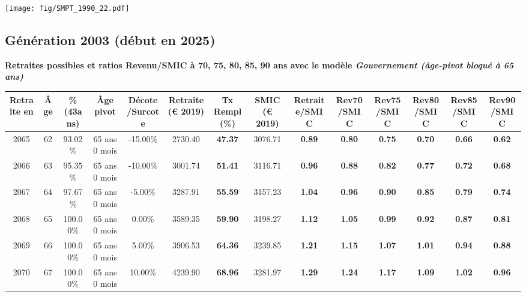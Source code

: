  \vspace{0.1cm} 

 \begin{center}\texttt{[image: fig/SMPT\_1990\_22.pdf]}\end{center} \label{fig/SMPT_1990_22.pdf} 

\newpage 
 
\subsection{Génération 2003 (début en 2025)} 

{\bf \noindent Retraites possibles et ratios Revenu/SMIC à 70, 75, 80, 85, 90 ans avec le modèle \emph{Gouvernement (âge-pivot bloqué à 65 ans)}}  
 
\begin{adjustbox}{max width=\textwidth} 
\begin{tabular}[htb]{|c|c||c|c|c||c|c||c||c|c|c|c|c|c|} 
\hline 
 Retraite en &  Âge &  \%(43ans) &  Âge pivot &  Décote/Surcote &  Retraite (\euro{} 2019) &  Tx Rempl(\%) &  SMIC (\euro{} 2019) &  Retraite/SMIC &  Rev70/SMIC &  Rev75/SMIC &  Rev80/SMIC &  Rev85/SMIC &  Rev90/SMIC \\ 
\hline \hline 
 2065 &  62 &  93.02\% &  65 ans 0 mois &  -15.00\% &  2730.40 &  {\bf 47.37} &  3076.71 &  {\bf {\color{red} 0.89}} &  {\bf {\color{red} 0.80}} &  {\bf {\color{red} 0.75}} &  {\bf {\color{red} 0.70}} &  {\bf {\color{red} 0.66}} &  {\bf {\color{red} 0.62}} \\ 
\hline 
 2066 &  63 &  95.35\% &  65 ans 0 mois &  -10.00\% &  3001.74 &  {\bf 51.41} &  3116.71 &  {\bf {\color{red} 0.96}} &  {\bf {\color{red} 0.88}} &  {\bf {\color{red} 0.82}} &  {\bf {\color{red} 0.77}} &  {\bf {\color{red} 0.72}} &  {\bf {\color{red} 0.68}} \\ 
\hline 
 2067 &  64 &  97.67\% &  65 ans 0 mois &  -5.00\% &  3287.91 &  {\bf 55.59} &  3157.23 &  {\bf 1.04} &  {\bf {\color{red} 0.96}} &  {\bf {\color{red} 0.90}} &  {\bf {\color{red} 0.85}} &  {\bf {\color{red} 0.79}} &  {\bf {\color{red} 0.74}} \\ 
\hline 
 2068 &  65 &  100.00\% &  65 ans 0 mois &  0.00\% &  3589.35 &  {\bf 59.90} &  3198.27 &  {\bf 1.12} &  {\bf 1.05} &  {\bf {\color{red} 0.99}} &  {\bf {\color{red} 0.92}} &  {\bf {\color{red} 0.87}} &  {\bf {\color{red} 0.81}} \\ 
\hline 
 2069 &  66 &  100.00\% &  65 ans 0 mois &  5.00\% &  3906.53 &  {\bf 64.36} &  3239.85 &  {\bf 1.21} &  {\bf 1.15} &  {\bf 1.07} &  {\bf 1.01} &  {\bf {\color{red} 0.94}} &  {\bf {\color{red} 0.88}} \\ 
\hline 
 2070 &  67 &  100.00\% &  65 ans 0 mois &  10.00\% &  4239.90 &  {\bf 68.96} &  3281.97 &  {\bf 1.29} &  {\bf 1.24} &  {\bf 1.17} &  {\bf 1.09} &  {\bf 1.02} &  {\bf {\color{red} 0.96}} \\ 
\hline 
\hline 
\end{tabular} 
\end{adjustbox} 
 
